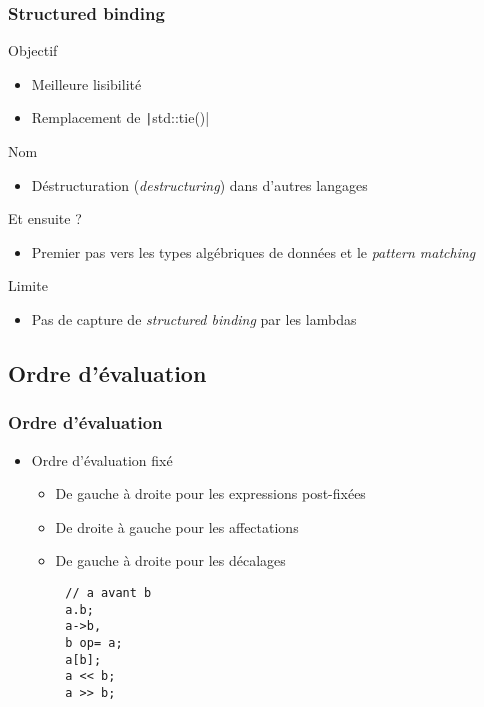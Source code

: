 \documentclass[C++.tex]{subfiles}
\begin{document}
\begin{frame}[fragile]
	\frametitle{Structured binding}
	\begin{block}{Objectif}
		\begin{itemize}
			\item Meilleure lisibilité
			\item Remplacement de \texttt|std::tie()|
		\end{itemize}
	\end{block}

	\begin{block}{Nom}
		\begin{itemize}
			\item Déstructuration (\textit{destructuring}) dans d'autres langages
		\end{itemize}
	\end{block}

	\begin{block}{Et ensuite ?}
		\begin{itemize}
			\item Premier pas vers les types algébriques de données et le \textit{pattern matching}
		\end{itemize}
	\end{block}


	\begin{alertblock}{Limite}
		\begin{itemize}
			\item Pas de capture de \textit{structured binding} par les lambdas
		\end{itemize}
	\end{alertblock}

\end{frame}

\subsection*{Ordre d'évaluation}
\begin{frame}[fragile]
	\frametitle{Ordre d'évaluation}
	\begin{itemize}
		\item Ordre d'évaluation fixé
		\begin{itemize}
			\item De gauche à droite pour les expressions post-fixées
			\item De droite à gauche pour les affectations
			\item De gauche à droite pour les décalages
		\end{itemize}
	\end{itemize}

	\begin{verbatim}
		// a avant b
		a.b;
		a->b,
		b op= a;
		a[b];
		a << b;
		a >> b;
	\end{verbatim}

\end{frame}
\end{document}
